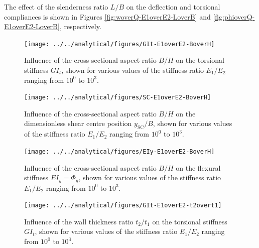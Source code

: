     The effect of the slenderness ratio $L/B$ on the deflection and torsional compliances is shown in Figures \ref{fig:woverQ-E1overE2-LoverB} and \ref{fig:phioverQ-E1overE2-LoverB}, respectively.

    \begin{figure}[!htpb] %
      \centering
      \texttt{[image: ../../analytical/figures/GIt-E1overE2-BoverH]}
      \caption[Influence of the cross-sectional aspect ratio $B/H$ on the torsional stiffness $GI_t$]{Influence of the cross-sectional aspect ratio $B/H$ on the torsional stiffness $GI_t$, shown for various values of the stiffness ratio $E_1/E_2$ ranging from $10^0$ to $10^3$. }\label{fig:GIt-E1overE2-BoverH}
    \end{figure}

    \begin{figure}[!htpb] %
      \centering
      \texttt{[image: ../../analytical/figures/SC-E1overE2-BoverH]}
      \caption[Influence of the cross-sectional aspect ratio $B/H$ on the dimensionless shear centre position $y_{\mathrm{SC}}/B$]{Influence of the cross-sectional aspect ratio $B/H$ on the dimensionless shear centre position $y_{\mathrm{SC}}/B$, shown for various values of the stiffness ratio $E_1/E_2$ ranging from $10^0$ to $10^3$. }\label{fig:SC-E1overE2-BoverH}
    \end{figure}

    \begin{figure}[!htpb] %
      \centering
      \texttt{[image: ../../analytical/figures/EIy-E1overE2-BoverH]}
      \caption[Influence of the cross-sectional aspect ratio $B/H$ on the flexural stiffness $EI_y$]{Influence of the cross-sectional aspect ratio $B/H$ on the flexural stiffness $EI_y = \Phi_y$, shown for various values of the stiffness ratio $E_1/E_2$ ranging from $10^0$ to $10^3$. }\label{fig:EIy-E1overE2-BoverH}
    \end{figure}

    \begin{figure}[!htpb] %
      \centering
      \texttt{[image: ../../analytical/figures/GIt-E1overE2-t2overt1]}
      \caption[Influence of the wall thickness ratio $t_2/t_1$ on the torsional stiffness $GI_t$]{Influence of the wall thickness ratio $t_2/t_1$ on the torsional stiffness $GI_t$, shown for various values of the stiffness ratio $E_1/E_2$ ranging from $10^0$ to $10^3$. }\label{fig:GIt-E1overE2-t2overt1}
    \end{figure}

